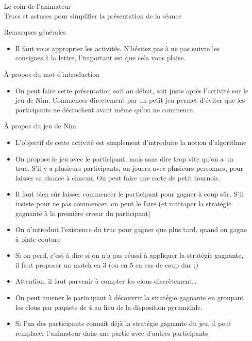 \documentclass[final,hyperref={pdfpagelabels=false}]{beamer}
\renewcommand*{\large}{\fontsize{\resultlargeX}{\resultlargeY}\selectfont}
\begin{document}
\begin{frame}{Le coin de l'animateur\\[-5pt]
  {\large Trucs et astuces pour simplifier la présentation de la séance}}
  \begin{block}{Remarques générales}
    \begin{itemize}
    \item Il faut vous approprier les activités. N'hésitez pas à ne pas suivre
      les consignes à la lettre, l'important est que cela vous plaise.
    \end{itemize}
  \end{block}
  \begin{block}{À propos du mot d'introduction}
    \begin{itemize}
    \item On peut faire cette présentation soit au début, soit juste après
      l'activité sur le jeu de Nim. Commencer directement par un petit jeu
      permet d'éviter que les participants ne décrochent avant même qu'on ne commence.
    \end{itemize}
  \end{block}
  \begin{block}{À propos du jeu de Nim}
    \begin{itemize}
    \item L'objectif de cette activité est simplement d'introduire la notion d'algorithme
    \item On propose le jeu avec le participant, mais sans dire trop vite qu'on
      a un truc. S'il y a plusieurs participants, on jouera avec plusieurs
      personnes, pour laisser sa chance à chacun. On peut faire une sorte de
      petit tournois.
    \item Il faut bien sûr laisser commencer le participant pour gagner à coup
      sûr. S'il insiste pour ne pas commencer, on peut le faire (et rattraper
      la stratégie gagnante à la première erreur du participant)
    \item On n'introduit l'existence du truc pour gagner que plus tard, quand
      on gagne à plate couture
    \item Si on perd, c'est à dire si on n'a pas réussi à appliquer la
      stratégie gagnante, il faut proposer un match en 3 (ou en 5 en cas de
      coup dur ;)
    \item Attention, il faut parvenir à compter les clous discrètement\ldots
    \item On peut amener le participant à découvrir la stratégie gagnante en
      groupant les clous par paquets de 4 au lieu de la disposition pyramidale.
    \item Si l'un des participants connaît déjà la stratégie gagnante du jeu,
      il peut remplacer l'animateur dans une partie avec d'autres participants
    \end{itemize}
  \end{block}
\end{frame}
\end{document}
